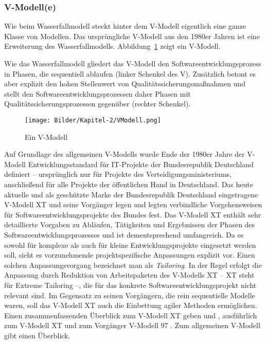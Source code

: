 \subsubsection{V-Modell(e)}
\label{sec:Kap-2.2.1.2}


Wie beim Wasserfallmodell steckt hinter dem V-Modell eigentlich eine ganze Klasse von Modellen. Das ursprüngliche V-Modell aus den 1980er Jahren ist eine Erweiterung des Wasserfallmodells. Abbildung~\ref{fig:v-modell} zeigt ein V-Modell. 


Wie das Wasserfallmodell gliedert das V-Modell den Softwareentwicklungsprozess in Phasen, die sequentiell ablaufen (linker Schenkel des V). Zusätzlich betont es aber explizit den hohen Stellenwert von Qualitätssicherungsmaßnahmen und stellt den Softwareentwicklungsprozessen daher Phasen mit Qualitätssicherungsprozessen gegenüber (rechter Schenkel).

\begin{figure}[h!]
	\centering
	\texttt{[image: Bilder/Kapitel-2/VModell.png]}
	\caption{Ein V-Modell \cite[554]{bal08}}
	\label{fig:v-modell}
\end{figure}

Auf Grundlage des allgemeinen V-Modells wurde Ende der 1980er Jahre der V-Modell Entwicklungsstandard für IT-Projekte der Bundesrepublik Deutschland definiert – ursprünglich nur für Projekte des Verteidigungsministeriums, anschließend für alle Projekte der öffentlichen Hand in Deutschland. Das heute aktuelle und als geschützte Marke der Bundesrepublik Deutschland eingetragene V-Modell XT und seine Vorgänger legen und legten verbindliche Vorgehensweisen für Softwareentwicklungsprojekte des Bundes fest. Das V-Modell XT enthält sehr detaillierte Vorgaben zu Abläufen, Tätigkeiten und Ergebnissen der Phasen des Softwareentwicklungsprozesses und ist dementsprechend umfangreich. Da es sowohl für komplexe als auch für kleine Entwicklungsprojekte eingesetzt werden soll, sieht es vorzunehmende projektspezifische Anpassungen explizit vor. Einen solchen Anpassungsvorgang bezeichnet man als \textit{Tailoring}. 
In der Regel erfolgt die Anpassung durch Reduktion von Arbeitspaketen des V-Modells XT – XT steht für Extreme Tailoring –, die für das konkrete Softwareentwicklungsprojekt nicht relevant sind. Im Gegensatz zu seinen Vorgängern, die rein sequentielle Modelle waren, soll das V-Modell XT auch die Einbettung agiler Methoden ermöglichen. Einen zusammenfassenden Überblick zum V-Modell XT geben \cite[620-637]{bal08} und \cite[105-110]{bro13}, ausführlich zum V-Modell XT \cite{hoe08} und zum Vorgänger V-Modell 97 \cite{dro00}. Zum allgemeinen V-Modell gibt \cite[553 \psqq]{bal08} einen Überblick. 